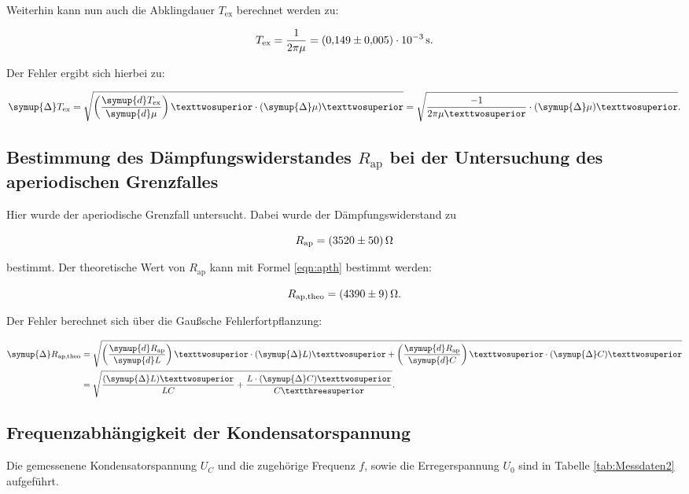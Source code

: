 Weiterhin kann nun auch die Abklingdauer $T_\text{ex}$ berechnet werden zu:

\begin{equation*}
T_\text{ex} = \frac{1}{2\pi\mu} = \SI{0.149+-0.005e-3}{\second}.
\end{equation*}

Der Fehler ergibt sich hierbei zu: 

\begin{equation*}
\symup{\Delta} T_\text{ex} = \sqrt{\left(\frac{\symup{d}T_\text{ex}}{\symup{d}\mu}\right)²\cdot (\symup{\Delta}\mu)²} = \sqrt{\frac{-1}{2\pi\mu²}\cdot(\symup{\Delta}\mu)²}.
\end{equation*}

\subsection{Bestimmung des Dämpfungswiderstandes $R_\text{ap}$ bei der Untersuchung 
des aperiodischen Grenzfalles}

Hier wurde der aperiodische Grenzfall untersucht. Dabei wurde der
Dämpfungswiderstand zu 

\begin{equation*}
R_\text{ap} = \SI{3520+-50}{\ohm}
\end{equation*}

bestimmt.
Der theoretische Wert von $R_\text{ap}$ kann mit Formel \eqref{eqn:apth} bestimmt 
werden: 

\begin{equation*}
R_\text{ap,theo} = \SI{4390+-9}{\ohm}.
\end{equation*}

Der Fehler berechnet sich über die Gaußsche Fehlerfortpflanzung: 

\begin{align*}
\symup{\Delta} R_\text{ap,theo} &= \sqrt{\left(\frac{\symup{d}R_\text{ap}}{\symup{d}L}\right)²\cdot (\symup{\Delta}L)² +
\left(\frac{\symup{d}R_\text{ap}}{\symup{d}C}\right)²\cdot (\symup{\Delta}C)²}\\
&= \sqrt{\frac{(\symup{\Delta}L)²}{LC}+\frac{L\cdot(\symup{\Delta}C)²}{C³}}
.
\end{align*}

\subsection{Frequenzabhängigkeit der Kondensatorspannung}

Die gemessenene Kondensatorspannung $U_C$ und die zugehörige Frequenz $f$, sowie
die Erregerspannung $U_0$ sind in Tabelle \ref{tab:Messdaten2} aufgeführt. 

